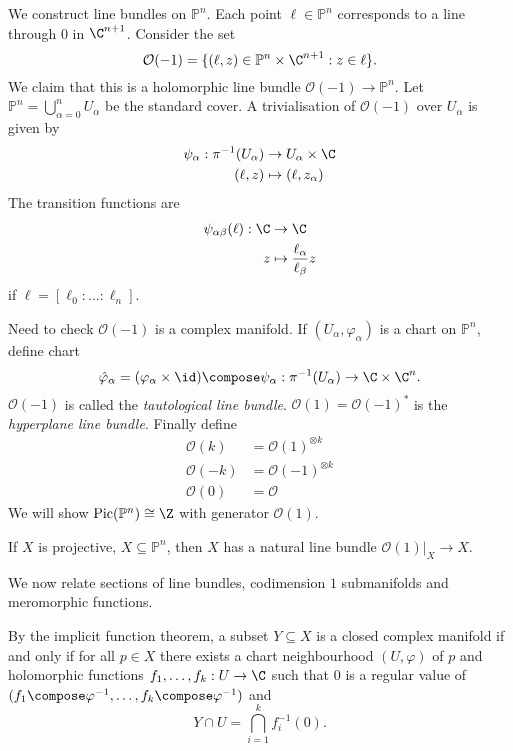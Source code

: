 \documentclass[a4paper]{article}
\renewcommand{\P}{\mathbb P} %
\DeclareMathOperator{\Pic}{Pic} %
\begin{document}
\begin{eg}
  We construct line bundles on \(\P^n\). Each point \(\ell \in \P^n\) corresponds to a line through \(0\) in \(\C^{n + 1}\). Consider the set
  \[
    \mathcal O(-1) = \{(\ell, z) \in \P^n \times \C^{n + 1}: z \in \ell\}.
  \]
  We claim that this is a holomorphic line bundle \(\mathcal O(-1) \to \P^n\). Let \(\P^n = \bigcup_{\alpha = 0}^n U_\alpha\) be the standard cover. A trivialisation of \(\mathcal O(-1)\) over \(U_\alpha\) is given by
  \begin{align*}
    \psi_\alpha: \pi^{-1}(U_\alpha) &\to U_\alpha \times \C \\
    (\ell, z) &\mapsto (\ell, z_\alpha)
  \end{align*}
  The transition functions are
  \begin{align*}
    \psi_{\alpha\beta}(\ell): \C &\to \C \\
    z &\mapsto \frac{\ell_\alpha}{\ell_\beta} z
  \end{align*}
  if \(\ell = [\ell_0 : \dots : \ell_n]\).

  Need to check \(\mathcal O(-1)\) is a complex manifold. If \((U_\alpha, \varphi_\alpha)\) is a chart on \(\P^n\), define chart
  \[
    \hat \varphi_\alpha = (\varphi_\alpha \times \id) \compose \psi_\alpha: \pi^{-1}(U_\alpha) \to \C \times \C^n.
  \]
  \(\mathcal O(-1)\) is called the \emph{tautological line bundle}. \(\mathcal O(1) = \mathcal O(-1)^*\) is the \emph{hyperplane line bundle}. Finally define
  \begin{align*}
    \mathcal O(k) &= \mathcal O(1)^{\otimes k} \\
    \mathcal O(-k) &= \mathcal O(-1)^{\otimes k} \\
    \mathcal O(0) &= \mathcal O
  \end{align*}
  We will show \(\Pic(\P^n) \cong \Z\) with generator \(\mathcal O(1)\).
\end{eg}

\begin{eg}
  If \(X\) is projective, \(X \subseteq \P^n\), then \(X\) has a natural line bundle \(\mathcal O(1)|_X \to X\).
\end{eg}

We now relate sections of line bundles, codimension \(1\) submanifolds and meromorphic functions.

By the implicit function theorem, a subset \(Y \subseteq X\) is a closed complex manifold if and only if for all \(p \in X\) there exists a chart neighbourhood \((U, \varphi)\) of \(p\) and holomorphic functions \(f_1, \dots, f_k: U \to \C\) such that \(0\) is a regular value of \((f_1 \compose \varphi^{-1}, \dots, f_k \compose \varphi^{-1})\) and
\[
  Y \cap U = \bigcap_{i = 1}^k f_i^{-1}(0).
\]
\end{document}
